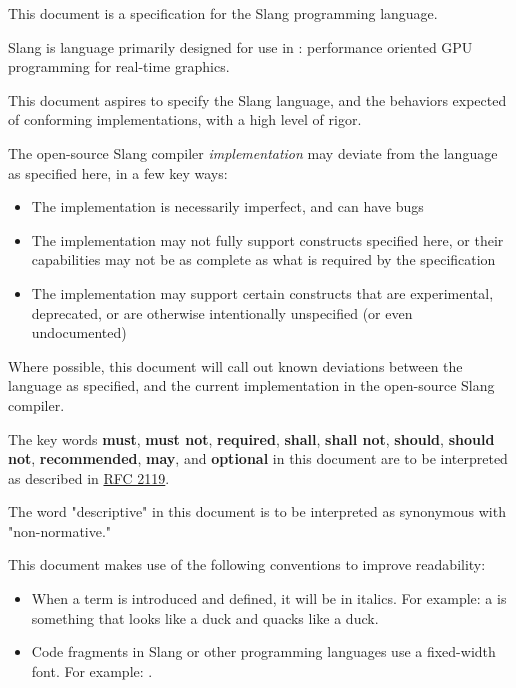 

This document is a specification for the Slang programming language.

Slang is language primarily designed for use in : performance oriented GPU programming for real-time graphics.


This document aspires to specify the Slang language, and the behaviors expected of conforming implementations, with a high level of rigor.

The open-source Slang compiler \emph{implementation} may deviate from the language as specified here, in a few key ways:

\begin{itemize}
    \item{The implementation is necessarily imperfect, and can have bugs}
    \item{The implementation may not fully support constructs specified here, or their capabilities may not be as complete as what is required by the specification}
    \item{The implementation may support certain constructs that are experimental, deprecated, or are otherwise intentionally unspecified (or even undocumented)}
\end{itemize}

Where possible, this document will call out known deviations between the language as specified, and the current implementation in the open-source Slang compiler.


The key words \textbf{must}, \textbf{must not}, \textbf{required}, \textbf{shall}, \textbf{shall not}, \textbf{should}, \textbf{should not}, \textbf{recommended}, \textbf{may}, and \textbf{optional} in this document are to be interpreted as described in \href{https://www.ietf.org/rfc/rfc2119.txt}{RFC 2119}.

The word "descriptive" in this document is to be interpreted as synonymous with "non-normative."


This document makes use of the following conventions to improve readability:

\begin{itemize}
    \item{When a term is introduced and defined, it will be in italics. For example: a  is something that looks like a duck and quacks like a duck.}
    \item{Code fragments in Slang or other programming languages use a fixed-width font. For example: .}
\end{itemize}

